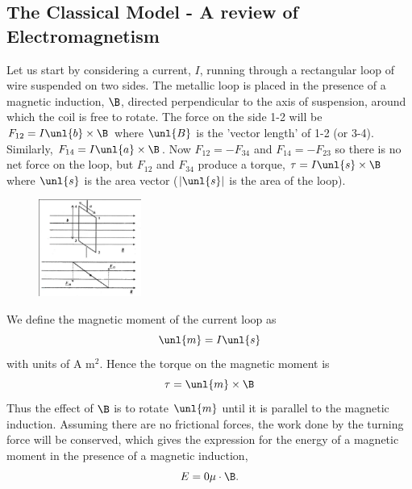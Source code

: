 \documentclass[a4paper, 11pt, normalem]{report}
\begin{document}
\subsection{The Classical Model - A review of Electromagnetism}
Let us start by considering a current, $I$, running through a rectangular loop of wire suspended on two sides. 
The metallic loop is placed in the presence of a magnetic induction, $\B$, directed perpendicular to the axis of suspension, around which the coil is free to rotate. 
The force on the side 1-2 will be $F_{12} = I\unl{b}\times\B$ where $\unl{B}$ is the 'vector length' of 1-2 (or 3-4). 
Similarly, $F_{14} = I\unl{a}\times\B$.
Now $F_{12} = -F_{34}$ and $F_{14} = -F_{23}$ so there is no net force on the loop, but $F_{12}$ and $F_{34}$ produce a torque, $\tau = I\unl{s}\times\B$ where $\unl{s}$ is the area vector ($|\unl{s}|$ is the area of the loop).
\begin{figure}[H]
    \centering
    \includegraphics[width=0.3\textwidth]{induct.png}
\end{figure}
We define the magnetic moment of the current loop as
\begin{equation}
    \unl{m} = I\unl{s}
\end{equation}
with units of A m$^2$.
Hence the torque on the magnetic moment is 
\begin{equation}
    \tau = \unl{m} \times \B
\end{equation}
Thus the effect of $\B$ is to rotate $\unl{m}$ until it is parallel to the magnetic induction. 
Assuming there are no frictional forces, the work done by the turning force will be conserved, which gives the expression for the energy of a magnetic moment in the presence of a magnetic induction, 
\begin{equation}
    E = 0\mu\cdot\B.
\end{equation}
\end{document}
